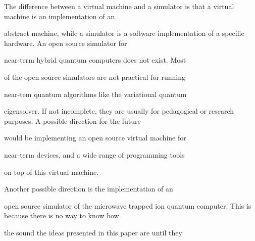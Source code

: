 \documentclass[a4paper,portrait,12pt]{article}
\begin{document}
\begin{flushleft}
The difference between a virtual machine and a simulator is that a virtual machine is an implementation of an
\end{flushleft}


\begin{flushleft}
abstract machine, while a simulator is a software implementation of a specific hardware. An open source simulator for
\end{flushleft}


\begin{flushleft}
near-term hybrid quantum computers does not exist. Most
\end{flushleft}


\begin{flushleft}
of the open source simulators are not practical for running
\end{flushleft}


\begin{flushleft}
near-tem quantum algorithms like the variational quantum
\end{flushleft}


\begin{flushleft}
eigensolver. If not incomplete, they are usually for pedagogical or research purposes. A possible direction for the future
\end{flushleft}


\begin{flushleft}
would be implementing an open source virtual machine for
\end{flushleft}


\begin{flushleft}
near-term devices, and a wide range of programming tools
\end{flushleft}


\begin{flushleft}
on top of this virtual machine.
\end{flushleft}


\begin{flushleft}
Another possible direction is the implementation of an
\end{flushleft}


\begin{flushleft}
open source simulator of the microwave trapped ion quantum computer. This is because there is no way to know how
\end{flushleft}


\begin{flushleft}
the sound the ideas presented in this paper are until they
\end{flushleft}
\end{document}
